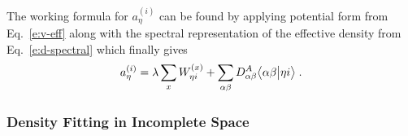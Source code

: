 %
%
The working formula for $a^{(i)}_\eta$ can be found by applying 
potential form from Eq.~\eqref{e:v-eff}
along with the spectral representation of the effective density from Eq.~\eqref{e:d-spectral} 
which finally gives
%
\begin{equation} \label{e:a-coeff-compl}
 a^{(i)}_\eta = \lambda \sum_{x} W_{\eta i}^{(x)} + 
 \sum_{\alpha\beta} D^A_{\alpha\beta} 
  \bigl\langle {\alpha\beta} \bigl\lvert {\eta i} \bigr\rangle \;.
\end{equation}
%

\subsubsection{\label{sss:2.3.1.GDF-2}Density Fitting in Incomplete Space}

